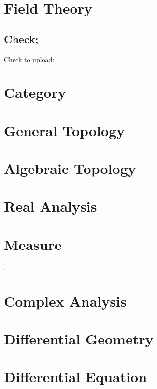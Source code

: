 \documentclass[8pt]{report}
\theoremstyle{romanstyle}
\begin{document}
\chapter{Field Theory}

\section{Check;}
Check to upload:
\chapter{Category}
\chapter{General Topology}
\chapter{Algebraic Topology}
\chapter{Real Analysis}
\chapter{Measure}
.
\chapter{Complex Analysis}
\chapter{Differential Geometry}
\chapter{Differential Equation}
\end{document}
